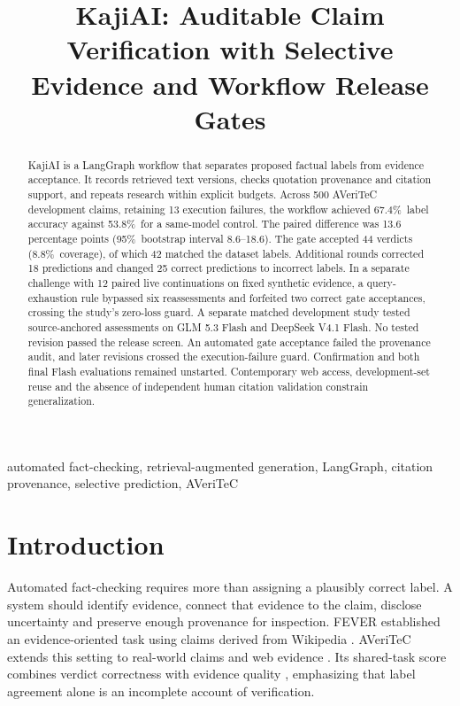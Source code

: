 \documentclass[conference]{IEEEtran}
\newcommand{\pct}{\%}
\begin{document}
\title{KajiAI: Auditable Claim Verification with Selective Evidence and Workflow Release Gates}

\author{}
\maketitle

\begin{abstract}
KajiAI is a LangGraph workflow that separates proposed factual labels from evidence acceptance. It records retrieved text versions, checks quotation provenance and citation support, and repeats research within explicit budgets. Across 500 AVeriTeC development claims, retaining 13 execution failures, the workflow achieved 67.4\pct\ label accuracy against 53.8\pct\ for a same-model control. The paired difference was 13.6 percentage points (95\pct\ bootstrap interval 8.6--18.6). The gate accepted 44 verdicts (8.8\pct\ coverage), of which 42 matched the dataset labels. Additional rounds corrected 18 predictions and changed 25 correct predictions to incorrect labels. In a separate challenge with 12 paired live continuations on fixed synthetic evidence, a query-exhaustion rule bypassed six reassessments and forfeited two correct gate acceptances, crossing the study's zero-loss guard. A separate matched development study tested source-anchored assessments on GLM 5.3 Flash and DeepSeek V4.1 Flash. No tested revision passed the release screen. An automated gate acceptance failed the provenance audit, and later revisions crossed the execution-failure guard. Confirmation and both final Flash evaluations remained unstarted. Contemporary web access, development-set reuse and the absence of independent human citation validation constrain generalization.
\end{abstract}

\begin{IEEEkeywords}
automated fact-checking, retrieval-augmented generation, LangGraph, citation provenance, selective prediction, AVeriTeC
\end{IEEEkeywords}

\section{Introduction}
Automated fact-checking requires more than assigning a plausibly correct label. A system should identify evidence, connect that evidence to the claim, disclose uncertainty and preserve enough provenance for inspection. FEVER established an evidence-oriented task using claims derived from Wikipedia \cite{fever}. AVeriTeC extends this setting to real-world claims and web evidence \cite{averitec}. Its shared-task score combines verdict correctness with evidence quality \cite{sharedtask}, emphasizing that label agreement alone is an incomplete account of verification.
\end{document}
